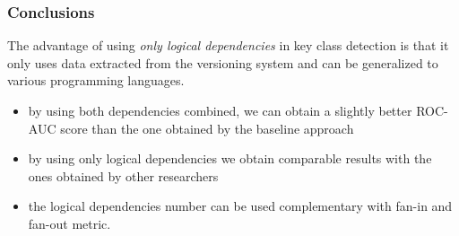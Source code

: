\documentclass{beamer}
\begin{document}

 \begin{frame}
\frametitle{Conclusions}
 The advantage of using \textit{only logical dependencies} in key class detection is that it only uses data extracted from the versioning system
and can be generalized to various programming languages.

\begin{itemize}
\item by using both dependencies combined, we can obtain a slightly better ROC-AUC score than the one obtained by the baseline approach
\item by using only logical dependencies we obtain comparable  results with the ones obtained by other researchers
\end{itemize}

\begin{table}[!h]
\renewcommand{\arraystretch}{1}
\label{tab:measurementstop:ant}
\centering
{}
\end{table}



\begin{itemize}
\item the logical dependencies number can be used complementary with fan-in and fan-out metric.
\end{itemize}



\end{frame}

\begin{frame}

\footnotesize

\end{frame}
\end{document}
